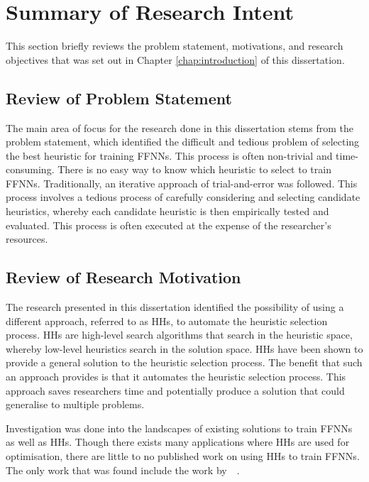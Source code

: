 \section{Summary of Research Intent}
\label{sec:conclusion:research_goals}

This section briefly reviews the problem statement, motivations, and research objectives that was set out in Chapter \ref{chap:introduction} of this dissertation.

\subsection{Review of Problem Statement}
\label{sec:conclusion:research_goals:problem_statement}

The main area of focus for the research done in this dissertation stems from the problem statement, which identified the difficult and tedious problem of selecting the best heuristic for training \acp{FFNN}. This process is often non-trivial and time-consuming. There is no easy way to know which heuristic to select to train \acp{FFNN}. Traditionally, an iterative approach of trial-and-error was followed. This process involves a tedious process of carefully considering and selecting candidate heuristics, whereby each candidate heuristic is then empirically tested and evaluated. This process is often executed at the expense of the researcher's resources.


\subsection{Review of Research Motivation}
\label{sec:conclusion:research_goals:motivations}

The research presented in this dissertation identified the possibility of using a different approach, referred to as \acp{HH}, to automate the heuristic selection process. \acp{HH} are high-level search algorithms that search in the heuristic space, whereby low-level heuristics search in the solution space. \acp{HH} have been shown to provide a general solution to the heuristic selection process. The benefit that such an approach provides is that it automates the heuristic selection process. This approach saves researchers time and potentially produce a solution that could generalise to multiple problems.

Investigation was done into the landscapes of existing solutions to train \acp{FFNN} as well as \acp{HH}. Though there exists many applications where \acp{HH} are used for optimisation, there are little to no published work on using \acp{HH} to train \acp{FFNN}. The only work that was found include the work by~\citeauthor{ref:nel:2021}~\cite{ref:nel:2021}.

